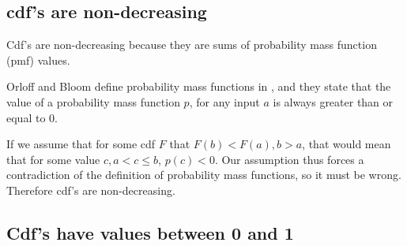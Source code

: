 \documentclass[a4paper,11pt]{article}
\begin{document}
\subsection{cdf's are non-decreasing}

Cdf's are non-decreasing because they are sums of probability mass
function (pmf) values.

Orloff and Bloom define probability mass functions in \cite{reading4}, 
and they state that the value of a probability mass function $p$,
for any input $a$ is always greater than or equal to 0.

If we assume that for some cdf $F$ that $F \left( b \right) <
F \left(a \right), b > a$, that would mean that for some value
$c, a < c \leq b$, $p\left( c \right) < 0$.  Our assumption thus
forces a contradiction of the definition of probability mass functions,
so it must be wrong.  Therefore cdf's are non-decreasing.

\subsection{Cdf's have values between 0 and 1}


\printbibliography{}
\end{document}
